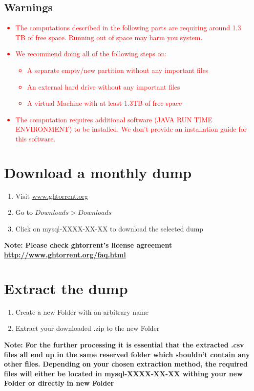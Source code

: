 \documentclass[11pt]{article}
\begin{document}
\subsection{Warnings}
\textcolor{red}{
\begin{itemize}
\item The computations described in the following parts are requiring around 1.3 TB of free space. Running out of space may harm you system.
\item We recommend doing all of the following steps on: 
\begin{itemize}
\item A separate empty/new partition without any important files
\item An external hard drive without any important files
\item A virtual Machine with at least 1.3TB of free space
\end{itemize}
\item The computation requires additional software (JAVA RUN TIME ENVIRONMENT) to be installed. We don't provide an installation guide for this software.
\end{itemize}
}
\newpage


\newpage

\section{Download a monthly dump}
\begin{enumerate}
\item Visit \url{www.ghtorrent.org}
\item Go to $Downloads > Downloads$
\item Click on mysql-XXXX-XX-XX to download the selected dump
\end{enumerate}
\textbf{Note: Please check ghtorrent's license agreement \url{http://www.ghtorrent.org/faq.html}}
\section{Extract the dump}
\begin{enumerate}
\item Create a new Folder with an arbitrary name
\item Extract your downloaded .zip to the new Folder
\end{enumerate}
\textbf{Note: For the further processing it is essential that the extracted .csv files all end up in the same reserved folder which shouldn't contain any other files. Depending on your chosen extraction method, the required files will either be located in mysql-XXXX-XX-XX withing your new Folder or directly in new Folder}
\end{document}
